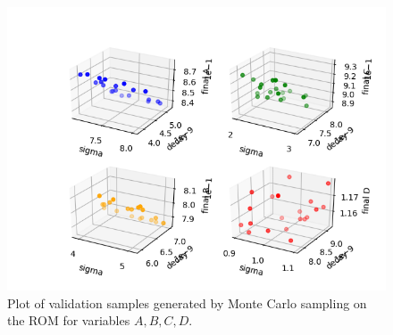  \begin{figure}[h!]
  \centering
  \includegraphics[scale=0.7]{../../tests/framework/user_guide/ForwardSamplingStrategies/gold/RunDir/SparseGrid/1-samplesROMPlot3D_scatter-scatter-scatter-scatter.png}
  \caption{Plot of validation samples generated by Monte Carlo sampling on the ROM for variables $A,B,C,D$.}
  \label{fig:samplesROMSparseGridPlot}
 \end{figure}








